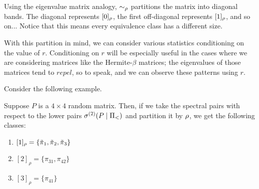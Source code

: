 \begin{remark}
Using the eigenvalue matrix analogy, $\sim_{\rho}$ partitions the matrix into diagonal bands.
The diagonal represents $[0]_{\rho}$, the first off-diagonal represents $[1]_{\rho}$, and so on...
Notice that this means every equivalence class has a different size.
\end{remark}

\newpage

With this partition in mind, we can consider various statistics conditioning on the value of $r$.
Conditioning on $r$ will be especially useful in the cases where we are considering matrices like the Hermite-$\beta$ matrices;
the eigenvalues of those matrices tend to $\textit{repel}$, so to speak, and we can observe these patterns using $r$. \newline

\noindent Consider the following example.

\begin{example}
Suppose $P$ is a $4 \times 4$ random matrix. Then, if we take the spectral pairs with respect to the lower pairs ${\sigma^{(2)}}(P \mid \Pi_<)$ and partition it by ${\rho}$,
we get the following classes:
\begin{enumerate}
  \item $[1]_\rho = \{{\tilde{\pi}}_1, {\tilde{\pi}}_2, {\tilde{\pi}}_3\}$
  \item $[2]_\rho = \{\pi_{31}, \pi_{42}\}$
  \item $[3]_\rho = \{\pi_{41}\}$
\end{enumerate}
\end{example}



%
%

\newpage
